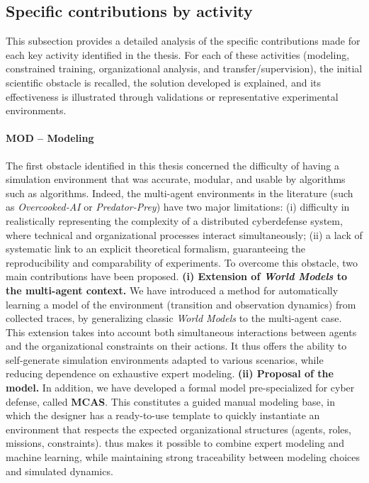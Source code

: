 \subsection*{Specific contributions by activity}
This subsection provides a detailed analysis of the specific contributions made for each key activity identified in the thesis. For each of these activities (modeling, constrained training, organizational analysis, and transfer/supervision), the initial scientific obstacle is recalled, the solution developed is explained, and its effectiveness is illustrated through validations or representative experimental environments.
\paragraph{MOD – Modeling}
The first obstacle identified in this thesis concerned the difficulty of having a simulation environment that was accurate, modular, and usable by algorithms such as  algorithms.
Indeed, the multi-agent environments in the literature (such as \textit{Overcooked-AI} or \textit{Predator-Prey}) have two major limitations:
(i) difficulty in realistically representing the complexity of a distributed cyberdefense system, where technical and organizational processes interact simultaneously;
(ii) a lack of systematic link to an explicit theoretical formalism, guaranteeing the reproducibility and comparability of experiments.
To overcome this obstacle, two main contributions have been proposed.
\medskip
\noindent
\textbf{(i) Extension of \textit{World Models} to the multi-agent context.}
We have introduced a method for automatically learning a model of the environment (transition and observation dynamics) from collected traces, by generalizing classic \textit{World Models} to the multi-agent case.
This extension takes into account both simultaneous interactions between agents and the organizational constraints on their actions.
It thus offers the ability to self-generate simulation environments adapted to various scenarios, while reducing dependence on exhaustive expert modeling.
\medskip
\noindent
\textbf{(ii) Proposal of the  model.}
In addition, we have developed a formal model  pre-specialized for cyber defense, called \textbf{MCAS}.
This constitutes a guided manual modeling base, in which the designer has a ready-to-use template to quickly instantiate an environment that respects the expected organizational structures (agents, roles, missions, constraints).
 thus makes it possible to combine expert modeling and machine learning, while maintaining strong traceability between modeling choices and simulated dynamics.
